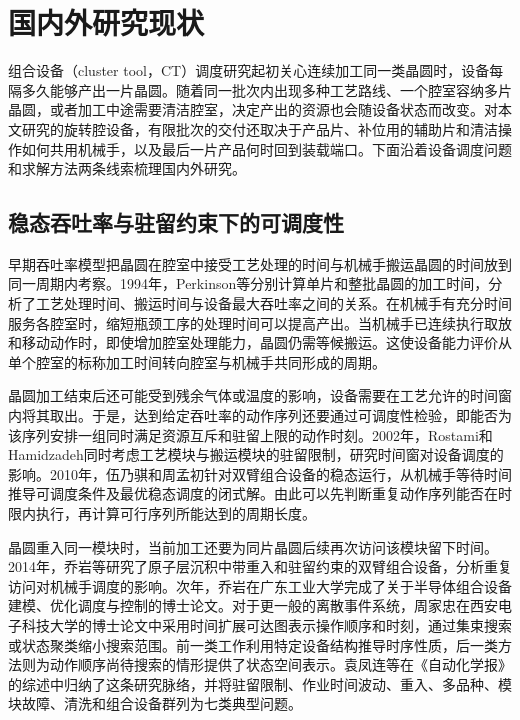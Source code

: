 \chapter{国内外研究现状}

组合设备（cluster tool，CT）调度研究起初关心连续加工同一类晶圆时，设备每隔多久能够产出一片晶圆。随着同一批次内出现多种工艺路线、一个腔室容纳多片晶圆，或者加工中途需要清洁腔室，决定产出的资源也会随设备状态而改变。对本文研究的旋转腔设备，有限批次的交付还取决于产品片、补位用的辅助片和清洁操作如何共用机械手，以及最后一片产品何时回到装载端口。下面沿着设备调度问题和求解方法两条线索梳理国内外研究。

\section{稳态吞吐率与驻留约束下的可调度性}

早期吞吐率模型把晶圆在腔室中接受工艺处理的时间与机械手搬运晶圆的时间放到同一周期内考察。1994年，Perkinson等分别计算单片和整批晶圆的加工时间，分析了工艺处理时间、搬运时间与设备最大吞吐率之间的关系\citep{perkinson1994throughput}。在机械手有充分时间服务各腔室时，缩短瓶颈工序的处理时间可以提高产出。当机械手已连续执行取放和移动动作时，即使增加腔室处理能力，晶圆仍需等候搬运。这使设备能力评价从单个腔室的标称加工时间转向腔室与机械手共同形成的周期。

晶圆加工结束后还可能受到残余气体或温度的影响，设备需要在工艺允许的时间窗内将其取出。于是，达到给定吞吐率的动作序列还要通过可调度性检验，即能否为该序列安排一组同时满足资源互斥和驻留上限的动作时刻。2002年，Rostami和Hamidzadeh同时考虑工艺模块与搬运模块的驻留限制，研究时间窗对设备调度的影响\citep{rostami2002optimal}。2010年，伍乃骐和周孟初针对双臂组合设备的稳态运行，从机械手等待时间推导可调度条件及最优稳态调度的闭式解\citep{wu2010closedform}。由此可以先判断重复动作序列能否在时限内执行，再计算可行序列所能达到的周期长度。

晶圆重入同一模块时，当前加工还要为同片晶圆后续再次访问该模块留下时间。2014年，乔岩等研究了原子层沉积中带重入和驻留约束的双臂组合设备，分析重复访问对机械手调度的影响\citep{qiao2014revisiting}。次年，乔岩在广东工业大学完成了关于半导体组合设备建模、优化调度与控制的博士论文\citep{qiao2015thesis}。对于更一般的离散事件系统，周家忠在西安电子科技大学的博士论文中采用时间扩展可达图表示操作顺序和时刻，通过集束搜索或状态聚类缩小搜索范围\citep{zhou2022thesis}。前一类工作利用特定设备结构推导时序性质，后一类方法则为动作顺序尚待搜索的情形提供了状态空间表示。袁凤连等在《自动化学报》的综述中归纳了这条研究脉络，并将驻留限制、作业时间波动、重入、多品种、模块故障、清洗和组合设备群列为七类典型问题\citep{yuan2023survey}。


